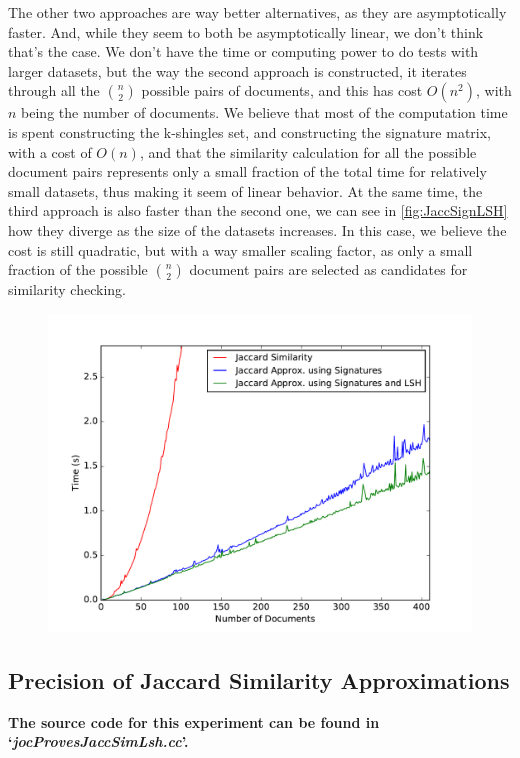 \documentclass[12pt]{article}
\begin{document}
The other two approaches are way better alternatives, as they are asymptotically faster.
And, while they seem to both be asymptotically linear, we don't think that's the case.
We don't have the time or computing power to do tests with larger datasets, but the way the second approach is constructed, it iterates through all the $\binom{n}{2}$ possible pairs of documents, and this has cost $O(n^2)$, with $n$ being the number of documents. 
We believe that most of the computation time is spent constructing the k-shingles set, and constructing the signature matrix, with a cost of $O(n)$, and that the similarity calculation for all the possible document pairs represents only a small fraction of the total time for relatively small datasets, thus making it seem of linear behavior.
At the same time, the third approach is also faster than the second one, we can see in \autoref{fig:JaccSignLSH} how they diverge as the size of the datasets increases.
In this case, we believe the cost is still quadratic, but with a way smaller scaling factor, as only a small fraction of the possible $\binom{n}{2}$ document pairs are selected as candidates for similarity checking.
\bigskip

\begin{figure}[H]
	\centering
	\includegraphics[scale=0.55]{graphs/JaccardSignatureLSHTimes.pdf}
	\caption{}
	\label{fig:JaccSignLSH}
\end{figure}

\subsection{Precision of Jaccard Similarity Approximations}
\textbf{The source code for this experiment can be found in `\textit{jocProvesJaccSimLsh.cc}'.}
\bigskip
\end{document}
